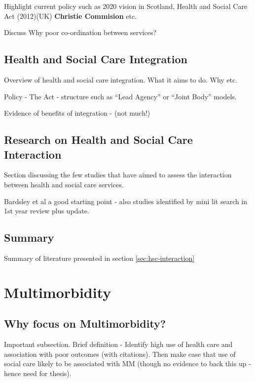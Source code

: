 \documentclass[12pt,]{report}
\begin{document}
Highlight current policy such as 2020 vision in Scotland, Health and
Social Care Act (2012)(UK) \textbf{Christie Commision} etc.

Discuss Why poor co-ordination between services?

\subsection{Health and Social Care Integration}\label{subsec:hsc-integration}

Overview of health and social care integration. What it aims to do. Why
etc.

Policy - The Act - structure such as ``Lead Agency'' or ``Joint Body''
models.

Evidence of benefits of integration - (not much!)

\subsection{Research on Health and Social Care Interaction}\label{subsec:research}

Section discussing the few studies that have aimed to assess the
interaction between health and social care services.

Bardsley et al\citeyearpar{RN183} a good starting point - also studies
identified by mini lit search in 1st year review plus update.

\subsection{Summary}\label{subsec:hsc-interaction-summary}

Summary of literature presented in section \ref{sec:hsc-interaction}

\section{Multimorbidity}\label{sec:mm}

\subsection{Why focus on Multimorbidity?}\label{subsec:why-mm}

Important subsection. Brief definition - Identify high use of health
care and association with poor outcomes (with citations). Then make case
that use of social care likely to be associated with MM (though no
evidence to back this up - hence need for thesis).
\end{document}
